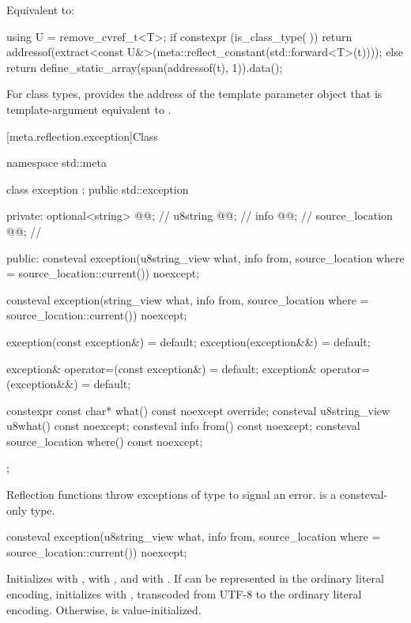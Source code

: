 \begin{itemdescr}
\pnum
\effects
Equivalent to:
\begin{codeblock}
using U = remove_cvref_t<T>;
if constexpr (is_class_type(^^U)) {
  return addressof(extract<const U&>(meta::reflect_constant(std::forward<T>(t))));
} else {
  return define_static_array(span(addressof(t), 1)).data();
}
\end{codeblock}

\pnum
\begin{note}
For class types,
 provides
the address of the template parameter object
that is template-argument equivalent to .
\end{note}
\end{itemdescr}

[meta.reflection.exception]{Class }

%
\begin{codeblock}
namespace std::meta {
  class exception : public std::exception {
  private:
    optional<string> @@;     // \expos
    u8string @@;           // \expos
    info @@;                 // \expos
    source_location @@;     // \expos

  public:
    consteval exception(u8string_view what, info from,
                        source_location where = source_location::current()) noexcept;

    consteval exception(string_view what, info from,
                        source_location where = source_location::current()) noexcept;

    exception(const exception&) = default;
    exception(exception&&) = default;

    exception& operator=(const exception&) = default;
    exception& operator=(exception&&) = default;

    constexpr const char* what() const noexcept override;
    consteval u8string_view u8what() const noexcept;
    consteval info from() const noexcept;
    consteval source_location where() const noexcept;
  };
}
\end{codeblock}

\pnum
Reflection functions throw exceptions of type 
to signal an error.
 is a consteval-only type.

%
\begin{itemdecl}
consteval exception(u8string_view what, info from,
                    source_location where = source_location::current()) noexcept;
\end{itemdecl}
\begin{itemdescr}
\pnum
\effects
Initializes
 with ,
 with , and
 with .
If  can be represented in the ordinary literal encoding,
initializes  with ,
transcoded from UTF-8 to the ordinary literal encoding.
Otherwise,  is value-initialized.
\end{itemdescr}


